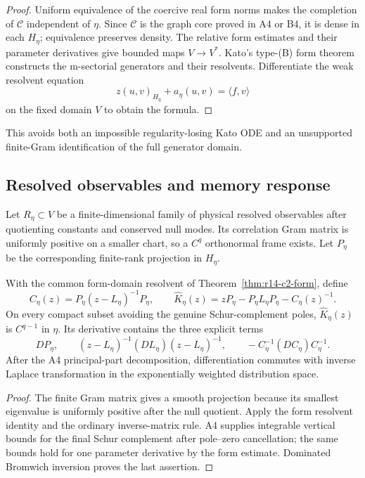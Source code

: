 \begin{proof}
Uniform equivalence of the coercive real form norms makes the completion of
\(\mathcal C\) independent of \(\eta\).  Since \(\mathcal C\) is the graph
core proved in A4 or B4, it is dense in each \(H_\eta\); equivalence preserves
density.  The relative form estimates and their parameter derivatives give
bounded maps \(V\to V^*\).  Kato's type-(B) form theorem constructs the
m-sectorial generators and their resolvents.  Differentiate the weak
resolvent equation
\[
 z(u,v)_{H_\eta}+a_\eta(u,v)=\langle f,v\rangle
\]
on the fixed domain \(V\) to obtain the formula.
\end{proof}

This avoids both an impossible regularity-losing Kato ODE and an unsupported
finite-Gram identification of the full generator domain.

\subsection{Resolved observables and memory response}

Let \(R_\eta\subset V\) be a finite-dimensional family of physical resolved
observables after quotienting constants and conserved null modes.  Its
correlation Gram matrix is uniformly positive on a smaller chart, so a
\(C^q\) orthonormal frame exists.  Let \(P_\eta\) be the corresponding
finite-rank projection in \(H_\eta\).

\begin{theorem}
\label{thm:r14-c2-memory}
With the common form-domain resolvent of
Theorem~\ref{thm:r14-c2-form}, define
\[
 C_\eta(z)=P_\eta(z-L_\eta)^{-1}P_\eta,\qquad
 \widehat K_\eta(z)
 =zP_\eta-P_\eta L_\eta P_\eta-C_\eta(z)^{-1}.
\]
On every compact subset avoiding the genuine Schur-complement poles,
\(\widehat K_\eta(z)\) is \(C^{q-1}\) in \(\eta\).  Its derivative contains
the three explicit terms
\[
 DP_\eta,\qquad
 (z-L_\eta)^{-1}(DL_\eta)(z-L_\eta)^{-1},
 \qquad
 -C_\eta^{-1}(DC_\eta)C_\eta^{-1}.
\]
After the A4 principal-part decomposition, differentiation commutes with
inverse Laplace transformation in the exponentially weighted distribution
space.
\end{theorem}

\begin{proof}
The finite Gram matrix gives a smooth projection because its smallest
eigenvalue is uniformly positive after the null quotient.  Apply the form
resolvent identity and the ordinary inverse-matrix rule.  A4 supplies
integrable vertical bounds for the final Schur complement after pole--zero
cancellation; the same bounds hold for one parameter derivative by the form
estimate.  Dominated Bromwich inversion proves the last assertion.
\end{proof}

